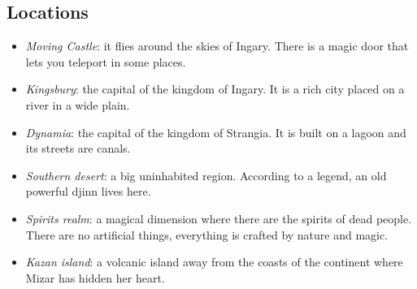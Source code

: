\subsection{Locations}
\begin{itemize}
	\item \textit{Moving Castle}: it flies around the skies of Ingary. There is a magic door that lets you teleport in some places.
	\item \textit{Kingsbury}: the capital of the kingdom of Ingary. It is a rich city placed on a river in a wide plain.
	\item \textit{Dynamia}: the capital of the kingdom of Strangia. It is built on a lagoon and its streets are canals.
	\item \textit{Southern desert}: a big uninhabited region. According to a legend, an old powerful djinn lives here.
	\item \textit{Spirits realm}: a magical dimension where there are the spirits of dead people. There are no artificial things, everything is crafted by nature and magic.
	\item \textit{Kazan island}: a volcanic island away from the coasts of the continent where Mizar has hidden her heart.

\end{itemize}
